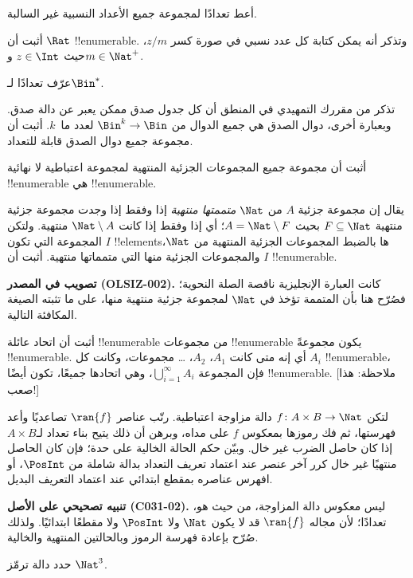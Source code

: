\documentclass[../../../include/open-logic-section]{subfiles}
\begin{document}
\begin{prob}
أعط تعدادًا لمجموعة جميع الأعداد النسبية غير السالبة.
\end{prob}

\begin{prob}
أثبت أن $\Rat$ !!{enumerable}. وتذكر أنه يمكن كتابة كل عدد نسبي
في صورة كسر $z/m$، حيث $z \in \Int$ و$m \in \Nat^+$.
\end{prob}

\begin{prob}
عرّف تعدادًا لـ$\Bin^*$.
\end{prob}

\begin{prob}
تذكر من مقررك التمهيدي في المنطق أن كل جدول صدق ممكن يعبر عن دالة
صدق. وبعبارة أخرى، دوال الصدق هي جميع الدوال من $\Bin^k \to \Bin$
لعدد ما~$k$. أثبت أن مجموعة جميع دوال الصدق قابلة للتعداد.
\end{prob}

\begin{prob}
أثبت أن مجموعة جميع المجموعات الجزئية المنتهية لمجموعة اعتباطية لا
نهائية !!{enumerable} هي !!{enumerable}.
\end{prob}

\begin{prob}
يقال إن مجموعة جزئية $A$ من $\Nat$ \emph{متممتها منتهية} إذا وفقط إذا
وجدت مجموعة جزئية منتهية $F\subseteq\Nat$ بحيث
$A=\Nat\setminus F$؛ أي إذا وفقط إذا كانت $\Nat\setminus A$ منتهية.
ولتكن $I$ المجموعة
التي تكون !!{element}sها بالضبط المجموعات الجزئية المنتهية من
$\Nat$، والمجموعات الجزئية منها التي متمماتها منتهية. أثبت أن $I$
!!{enumerable}.
\end{prob}

\begin{editorial}
\textbf{تصويب في المصدر (OLSIZ-002).}
كانت العبارة الإنجليزية ناقصة الصلة النحوية؛ فصُرّح هنا بأن المتممة تؤخذ
في $\Nat$ لمجموعة جزئية منتهية منها، على ما تثبته الصيغة المكافئة التالية.
\end{editorial}

\begin{prob}
أثبت أن اتحاد عائلة !!{enumerable} من مجموعات !!{enumerable} يكون
مجموعةً !!{enumerable}. أي إنه متى كانت $A_1$، $A_2$، \dots{} مجموعات،
وكانت كل $A_i$ !!{enumerable}، فإن المجموعة
$\bigcup_{i=1}^\infty
A_i$، وهي اتحادها جميعًا، تكون أيضًا !!{enumerable}. [ملاحظة: هذا صعب!]
\end{prob}

\begin{prob}
لتكن $f \colon A \times B \to \Nat$ دالة مزاوجة اعتباطية. رتّب عناصر
$\ran{f}$ تصاعديًا وأعد فهرستها، ثم فك رموزها بمعكوس $f$ على مداه، وبرهن
أن ذلك يتيح بناء تعداد لـ$A \times B$ إذا كان حاصل الضرب غير خال. وبيّن
حكم الحالة الخالية على حدة؛ فإن كان الحاصل منتهيًا غير خال كرر آخر عنصر
عند اعتماد تعريف التعداد بدالة شاملة من $\PosInt$، أو افهرس عناصره بمقطع
ابتدائي عند اعتماد التعريف البديل.
\end{prob}

\textbf{تنبيه تصحيحي على الأصل (C031-02).} ليس معكوس دالة المزاوجة، من حيث هو،
تعدادًا؛ لأن مجاله $\ran{f}$ قد لا يكون $\Nat$ ولا $\PosInt$ ولا مقطعًا
ابتدائيًا. ولذلك صُرّح بإعادة فهرسة الرموز وبالحالتين المنتهية والخالية.

\begin{prob}
حدد دالة ترمّز $\Nat^3$.
\end{prob}
\end{document}
